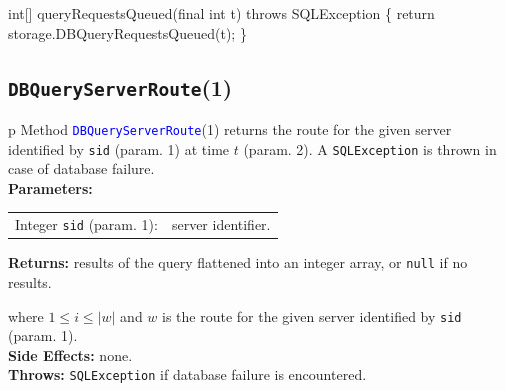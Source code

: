 \nwenddocs{}\endmoddef{}
int[] queryRequestsQueued(final int t) throws SQLException \{
  return storage.DBQueryRequestsQueued(t);
\}
\eatline
{}\nwendcode{}\nwdocspar
\subsection{\texttt{DBQueryServerRoute}(1)}
\begin{tabular}{p{\textwidth}}
\toprule
{}
Method \textcolor{blue}{{\tt{}\protect{}DBQueryServerRoute}}(1) returns the route for the
given server identified by {\tt{}sid} (param. 1) at time $t$ (param. 2).
A {\tt{}SQLException} is thrown in case of database failure.\\
\midrule
\textbf{Parameters:} \\
\begin{tabular}{lp{116mm}}
Integer {\tt{}sid} (param. 1):&server identifier.\\
\end{tabular}
\textbf{Returns:} results of the query flattened into an integer array,
or {\tt{}null} if no results.


where $1\leq i\leq |w|$ and $w$ is the route for the given server
identified by {\tt{}sid} (param. 1).\\
\textbf{Side Effects:} none.\\
\textbf{Throws:} {\tt{}SQLException} if database failure is encountered.\\
\bottomrule
\end{tabular}
